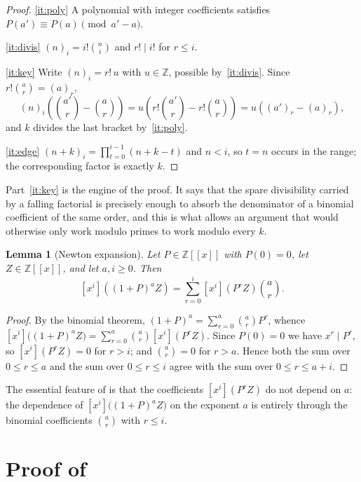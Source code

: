 \documentclass[11pt,a4paper]{article}
\theoremstyle{plain}
\newtheorem{lemma}[theorem]{Lemma}
\theoremstyle{definition}
\newcommand{\Z}{\mathbb{Z}}
\newcommand{\ff}[2]{(#1)_{#2}}
\newcommand{\coeff}[1]{[x^{#1}]}
\begin{document}
\begin{proof}
\ref{it:poly} A polynomial with integer coefficients satisfies
$P(a')\equiv P(a) \pmod{a'-a}$.

\ref{it:divis} $\ff{n}{i}=i!\binom{n}{i}$ and $r!\mid i!$ for $r\le i$.

\ref{it:key} Write $\ff{n}{i}=r!\,u$ with $u\in\Z$, possible by~\ref{it:divis}. Since
$r!\binom{a}{r}=\ff{a}{r}$,
\[
  \ff{n}{i}\left(\binom{a'}{r}-\binom{a}{r}\right)
  = u\left(r!\binom{a'}{r}-r!\binom{a}{r}\right)
  = u\left(\ff{a'}{r}-\ff{a}{r}\right),
\]
and $k$ divides the last bracket by~\ref{it:poly}.

\ref{it:edge} $\ff{n+k}{i}=\prod_{t=0}^{i-1}(n+k-t)$ and $n<i$, so $t=n$ occurs in the
range; the corresponding factor is exactly $k$.
\end{proof}

Part~\ref{it:key} is the engine of the proof. It says that the spare divisibility carried
by a falling factorial is precisely enough to absorb the denominator of a binomial
coefficient of the same order, and this is what allows an argument that would otherwise
only work modulo primes to work modulo every $k$.

\begin{lemma}[Newton expansion]\label{lem:newton}
Let $P\in\Z[[x]]$ with $P(0)=0$, let $Z\in\Z[[x]]$, and let $a,i\ge0$. Then
\[
  \coeff{i}\!\left((1+P)^{a}Z\right)=\sum_{r=0}^{i}\coeff{i}\!\left(P^{r}Z\right)\binom{a}{r}.
\]
\end{lemma}

\begin{proof}
By the binomial theorem, $(1+P)^{a}=\sum_{r=0}^{a}\binom{a}{r}P^{r}$, whence
$\coeff{i}\big((1+P)^{a}Z\big)=\sum_{r=0}^{a}\binom{a}{r}\coeff{i}(P^{r}Z)$. Since
$P(0)=0$ we have $x^{r}\mid P^{r}$, so $\coeff{i}(P^{r}Z)=0$ for $r>i$; and
$\binom{a}{r}=0$ for $r>a$. Hence both the sum over $0\le r\le a$ and the sum over
$0\le r\le i$ agree with the sum over $0\le r\le a+i$.
\end{proof}

The essential feature of  is that the coefficients
$\coeff{i}(P^{r}Z)$ do not depend on $a$: the dependence of
$\coeff{i}\big((1+P)^{a}Z\big)$ on the exponent $a$ is entirely through the binomial
coefficients $\binom{a}{r}$ with $r\le i$.

\section{Proof of \texorpdfstring{}{Theorem 1}}\label{sec:proof}
\end{document}
